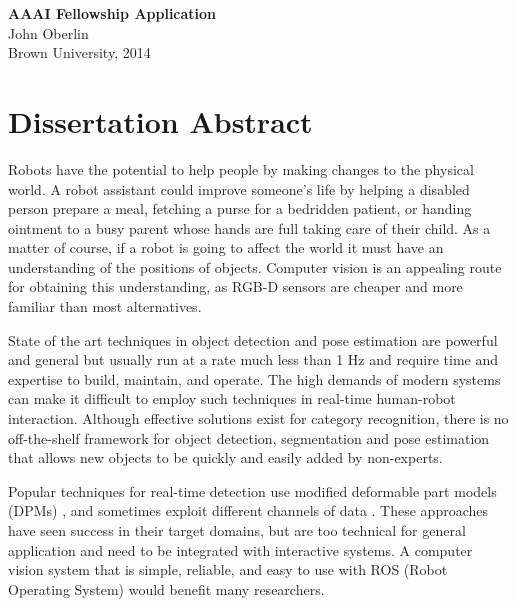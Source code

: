 \documentclass[12pt]{article}
\numberwithin{equation}{section}
\numberwithin{table}{section}
\numberwithin{figure}{section}
\begin{document}



\begin{center}
\textbf{\Large AAAI Fellowship Application}\\[12pt] 
John Oberlin\\
Brown University, 2014\\
\end{center}

\section{Dissertation Abstract}

Robots have the potential to help people by making changes to the physical world.
A robot assistant could improve someone's life by helping a disabled person prepare a meal,
fetching a purse for a bedridden patient, or handing ointment
to a busy parent whose hands are full taking care of their child. As a matter of course,
if a robot is going to affect the world it must have an understanding of the positions
of objects. Computer vision is an appealing route for obtaining this understanding, as RGB-D
sensors are cheaper and more familiar than most alternatives.

State of the art techniques in object detection and pose estimation
are powerful and general but usually run at a rate much less than 1 Hz and require
time and expertise to build, maintain, and operate. The high demands of modern systems
can make it difficult to employ such techniques in real-time human-robot interaction.
Although effective solutions exist for category recognition, there is no off-the-shelf
framework for object detection, segmentation and pose estimation that allows new objects
to be quickly and easily added by non-experts.

Popular techniques for real-time detection use modified deformable part models (DPMs) \cite{kostas1} \cite{forsyth1},
and sometimes exploit different channels of data \cite{dietr1} \cite{sliding1}.  
These approaches have seen success in their target domains, but are too technical for general
application and need to be integrated with interactive systems. A computer 
vision system that is simple, reliable, and easy to use with ROS (Robot Operating System)
would benefit many researchers.
\end{document}
